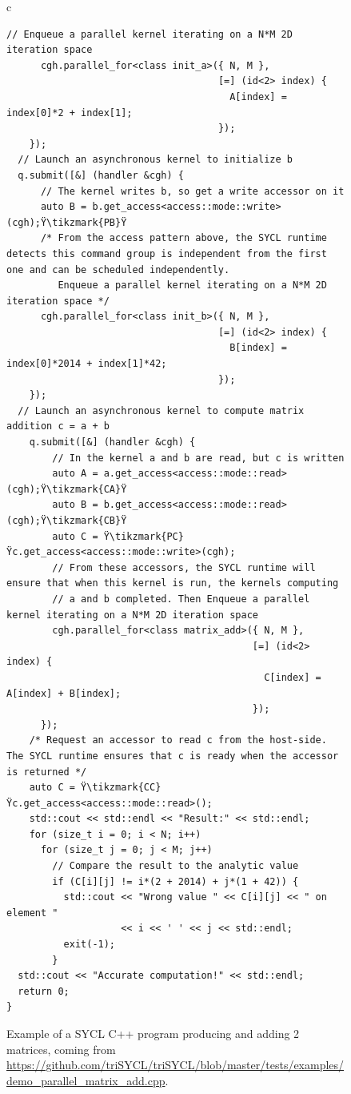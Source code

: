 \documentclass[sigplan, review, authordraft]{acmart}
\begin{document}
\begin{figure}
\begin{tabular}{c}
\begin{lstlisting}[basicstyle=\scriptsize,name=example]
      // Enqueue a parallel kernel iterating on a N*M 2D iteration space
      cgh.parallel_for<class init_a>({ N, M },
                                     [=] (id<2> index) {
                                       A[index] = index[0]*2 + index[1];
                                     });
    });
  // Launch an asynchronous kernel to initialize b
  q.submit([&] (handler &cgh) {
      // The kernel writes b, so get a write accessor on it
      auto B = b.get_access<access::mode::write>(cgh);Ÿ\tikzmark{PB}Ÿ
      /* From the access pattern above, the SYCL runtime detects this command group is independent from the first one and can be scheduled independently.
         Enqueue a parallel kernel iterating on a N*M 2D iteration space */
      cgh.parallel_for<class init_b>({ N, M },
                                     [=] (id<2> index) {
                                       B[index] = index[0]*2014 + index[1]*42;
                                     });
    });
  // Launch an asynchronous kernel to compute matrix addition c = a + b
    q.submit([&] (handler &cgh) {
        // In the kernel a and b are read, but c is written
        auto A = a.get_access<access::mode::read>(cgh);Ÿ\tikzmark{CA}Ÿ
        auto B = b.get_access<access::mode::read>(cgh);Ÿ\tikzmark{CB}Ÿ
        auto C = Ÿ\tikzmark{PC}Ÿc.get_access<access::mode::write>(cgh);
        // From these accessors, the SYCL runtime will ensure that when this kernel is run, the kernels computing
        // a and b completed. Then Enqueue a parallel kernel iterating on a N*M 2D iteration space
        cgh.parallel_for<class matrix_add>({ N, M },
                                           [=] (id<2> index) {
                                             C[index] = A[index] + B[index];
                                           });
      });
    /* Request an accessor to read c from the host-side. The SYCL runtime ensures that c is ready when the accessor is returned */
    auto C = Ÿ\tikzmark{CC}Ÿc.get_access<access::mode::read>();
    std::cout << std::endl << "Result:" << std::endl;
    for (size_t i = 0; i < N; i++)
      for (size_t j = 0; j < M; j++)
        // Compare the result to the analytic value
        if (C[i][j] != i*(2 + 2014) + j*(1 + 42)) {
          std::cout << "Wrong value " << C[i][j] << " on element "
                    << i << ' ' << j << std::endl;
          exit(-1);
        }
  std::cout << "Accurate computation!" << std::endl;
  return 0;
}
    \end{lstlisting}
  \end{tabular}
  \caption{Example of a SYCL C++ program producing and adding 2
    matrices, coming from
    \url{https://github.com/triSYCL/triSYCL/blob/master/tests/examples/demo_parallel_matrix_add.cpp}.\label{fig:SYCL-example}}
\end{figure}
\end{document}
